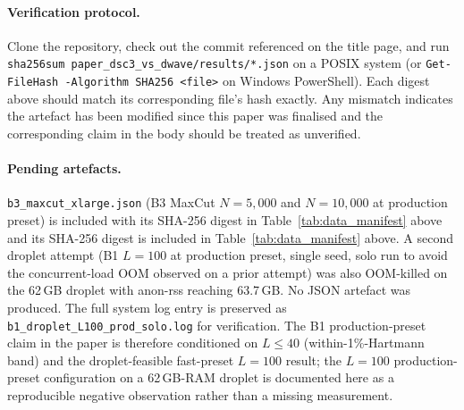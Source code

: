 \documentclass[11pt,a4paper]{article}
\begin{document}
\paragraph{Verification protocol.} Clone the repository, check out the
commit referenced on the title page, and run
\texttt{sha256sum paper\_dsc3\_vs\_dwave/results/*.json} on a POSIX
system (or \texttt{Get-FileHash -Algorithm SHA256 <file>} on
Windows PowerShell). Each digest above should match its corresponding
file's hash exactly. Any mismatch indicates the artefact has been
modified since this paper was finalised and the corresponding claim in
the body should be treated as unverified.

\paragraph{Pending artefacts.}
\texttt{b3\_maxcut\_xlarge.json} (B3 MaxCut $N\!=\!5{,}000$ and
$N\!=\!10{,}000$ at production preset) is included with its SHA-256 digest in Table~\ref{tab:data_manifest} above and
its SHA-256 digest is included in
Table~\ref{tab:data_manifest} above. A second droplet attempt
(B1 $L\!=\!100$ at production preset, single seed, solo run to avoid
the concurrent-load OOM observed on a prior attempt) was also
OOM-killed on the 62\,GB droplet with anon-rss reaching 63.7\,GB. No
JSON artefact was produced. The full system log entry is preserved as
\texttt{b1\_droplet\_L100\_prod\_solo.log} for verification. The B1
production-preset claim in the paper is therefore conditioned on
$L\!\le\!40$ (within-1\%-Hartmann band) and the droplet-feasible
fast-preset $L\!=\!100$ result; the $L\!=\!100$ production-preset
configuration on a 62\,GB-RAM droplet is documented here as a
reproducible negative observation rather than a missing measurement.
\end{document}
